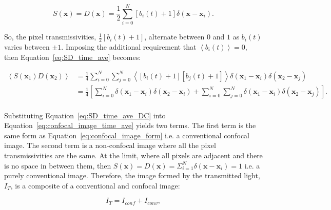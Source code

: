 \begin{equation}\label{eq:detector_aperture_time_DC}
S\left(\textbf{x}\right) = D\left(\textbf{x}\right) = \frac{1}{2} \sum_{i=0}^{N} \left[b_{i}\left(t\right) + 1\right]\delta\left(\textbf{x} - \textbf{x}_{i}\right).
\end{equation} 

So, the pixel transmissivities, $\frac{1}{2}\left[b_{i}\left(t\right) + 
1\right]$, alternate between $0$ and $1$ as $b_{i}\left(t\right)$ 
varies between $\pm1$. Imposing the additional requirement that 
$\left\langle b_{i}\left(t\right) \right\rangle = 0$, then 
Equation~\ref{eq:SD_time_ave} becomes:

\begin{equation}\label{eq:SD_time_ave_DC}
\begin{split}
\left\langle S\left(\textbf{x}_{1}\right) D\left(\textbf{x}_{2}\right)\right\rangle &= \frac{1}{4} \sum_{i=0}^{N}\sum_{j=0}^{N} \left\langle \left[b_{i}\left(t\right) + 1\right] \left[b_{j}\left(t\right) + 1\right] \right\rangle \delta\left(\textbf{x}_{1} - \textbf{x}_{i}\right) \delta\left(\textbf{x}_{2} - \textbf{x}_{j}\right)\\
&= \frac{1}{4} \left[\sum_{i=0}^{N} \delta\left(\textbf{x}_{1} - \textbf{x}_{i}\right) \delta\left(\textbf{x}_{2} - \textbf{x}_{i}\right) + \sum_{i=0}^{N}\sum_{j=0}^{N} \delta\left(\textbf{x}_{1} - \textbf{x}_{i}\right) \delta\left(\textbf{x}_{2} - \textbf{x}_{j}\right)\right].\\
\end{split}
\end{equation}

Substituting Equation~\ref{eq:SD_time_ave_DC} into Equation~\ref{eq:confocal_image_time_ave} 
yields two terms. The first term is the same form as 
Equation~\ref{eq:confocal_image_form} i.e. a conventional 
confocal image. The second term is a non-confocal image 
where all the pixel transmissivities are the same. At the 
limit, where all pixels are adjacent and there is no space 
in between them, then $S\left(\textbf{x}\right) = 
D\left(\textbf{x}\right) = \Sigma_{i=1}^{N}\delta\left(
\textbf{x} - \textbf{x}_{i}\right) = 1$ i.e. a purely 
conventional image\cite{juskaitis1996efficient,wilson1996confocal}. 
Therefore, the image formed by the transmitted light, $I_{T}$, 
is a composite of a conventional and confocal image:

\begin{equation}\label{eq:transmitted_image}
I_{T} = I_{conf} + I_{conv},
\end{equation}

